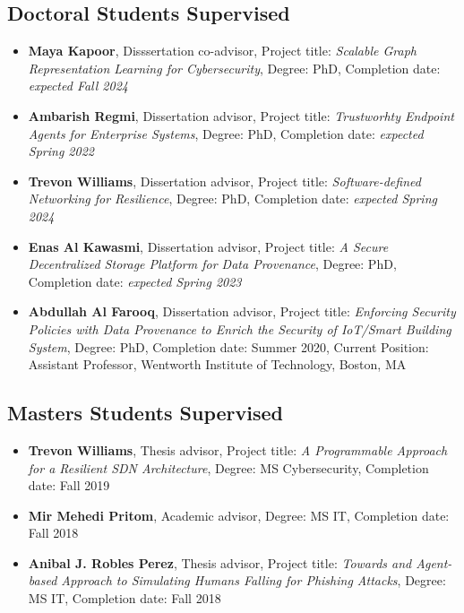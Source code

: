 
\hypertarget{phd-students}{%
\subsection{Doctoral Students Supervised}\label{phd-students}}

\begin{itemize}
\tightlist
\item \textbf{Maya Kapoor}, Disssertation co-advisor, Project title: \textit{Scalable Graph Representation Learning for Cybersecurity}, Degree: PhD, Completion date: \textit{expected Fall 2024}
\item \textbf{Ambarish Regmi}, Dissertation advisor, Project title: \textit{Trustworhty Endpoint Agents for Enterprise Systems}, Degree: PhD, Completion date: \textit{expected Spring 2022}
\item \textbf{Trevon Williams}, Dissertation advisor, Project title: \textit{Software-defined Networking for Resilience}, Degree: PhD, Completion date: \textit{expected Spring 2024}
\item \textbf{Enas Al Kawasmi}, Dissertation advisor, Project title: \textit{A Secure Decentralized Storage Platform for Data Provenance}, Degree: PhD, Completion date: \textit{expected Spring 2023}
\item \textbf{Abdullah Al Farooq}, Dissertation advisor, Project title: \textit{Enforcing Security Policies with Data Provenance to Enrich the Security of IoT/Smart Building System}, Degree: PhD, Completion date: Summer 2020, Current Position: Assistant Professor, Wentworth Institute of Technology, Boston, MA
\end{itemize}

\hypertarget{ms-students}{%
\subsection{Masters Students Supervised}\label{ms-students}}

\begin{itemize}
\tightlist
\item \textbf{Trevon Williams}, Thesis advisor, Project title: \textit{A Programmable Approach for a Resilient SDN Architecture}, Degree: MS Cybersecurity, Completion date: Fall 2019
\item \textbf{Mir Mehedi Pritom}, Academic advisor, Degree: MS IT, Completion date: Fall 2018
\item \textbf{Anibal J. Robles Perez}, Thesis advisor, Project title: \textit{Towards and Agent-based Approach to Simulating Humans Falling for Phishing Attacks}, Degree: MS IT, Completion date: Fall 2018
\end{itemize}

